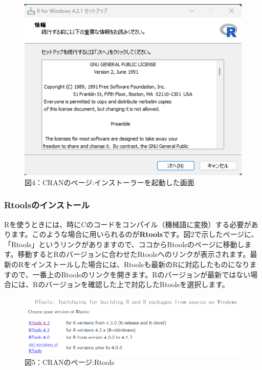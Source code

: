 \documentclass[
  letterpaper,
  DIV=11,
  numbers=noendperiod]{scrreprt}
\begin{document}
\begin{figure}

{\centering \includegraphics{././image/CRAN_install4_win.png}

}

\caption{図4：CRANのページ:インストーラーを起動した画面}

\end{figure}

\hypertarget{rtoolsux306eux30a4ux30f3ux30b9ux30c8ux30fcux30eb}{%
\subsubsection{Rtoolsのインストール}\label{rtoolsux306eux30a4ux30f3ux30b9ux30c8ux30fcux30eb}}

Rを使うときには、時にCのコードをコンパイル（機械語に変換）する必要があります。このような場合に用いられるのが\textbf{Rtools}です。図2で示したページに、「Rtools」というリンクがありますので、ココからRtoolsのページに移動します。移動するとRのバージョンに合わせたRtoolsへのリンクが表示されます。最新のRをインストールした場合には、Rtoolsも最新のRに対応したものになりますので、一番上のRtoolsのリンクを開きます。Rのバージョンが最新ではない場合には、Rのバージョンを確認した上で対応したRtoolsを選択します。

\begin{figure}

{\centering \includegraphics{././image/CRAN_install5_Rtools.png}

}

\caption{図5：CRANのページ:Rtools}

\end{figure}
\end{document}
